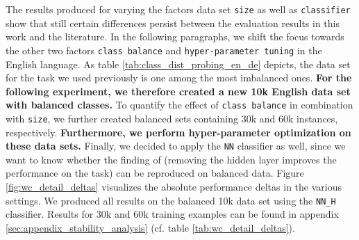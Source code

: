  The results produced for varying the factors data set \texttt{size} as well as \texttt{classifier} show that still certain differences persist between the evaluation results in this work and the literature. In the following paragraphs, we shift the focus towards the other two factors \texttt{class balance} and \texttt{hyper-parameter tuning} in the English language. As table \vref{tab:class_dist_probing_en_de} depicts, the data set for the  task we used previously is one among the most imbalanced ones. \textbf{For the following experiment, we therefore created a new 10k English data set with balanced classes.} To quantify the effect of \texttt{class balance} in combination with \texttt{size}, we further created balanced sets containing 30k and 60k instances, respectively. \textbf{Furthermore, we perform hyper-parameter optimization on these data sets.} Finally, we decided to apply the \texttt{NN} classifier as well, since we want to know whether the finding of \citep{Perone.2018,Conneau.2018a} (removing the hidden layer improves the performance on the  task) can be reproduced on balanced data. Figure \vref{fig:wc_detail_deltas} visualizes the absolute performance deltas in the various settings. We produced all results on the balanced 10k data set using the \texttt{NN\_H} classifier. Results for 30k and 60k training examples can be found in appendix \vref{sec:appendix_stability_analysis} (cf. table \vref{tab:wc_detail_deltas}).



